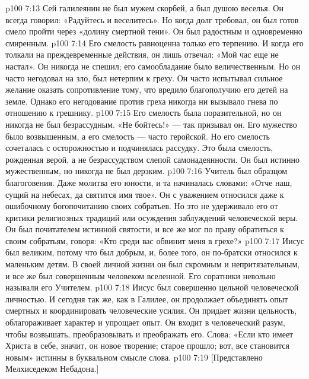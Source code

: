 \vs p100 7:13 Сей галилеянин не был мужем скорбей, а был душою веселья. Он всегда говорил: «Радуйтесь и веселитесь». Но когда долг требовал, он был готов смело пройти через «долину смертной тени». Он был радостным и одновременно смиренным.
\vs p100 7:14 Его смелость равноценна только его терпению. И когда его толкали на преждевременные действия, он лишь отвечал: «Мой час еще не настал». Он никогда не спешил; его самообладание было величественным. Но он часто негодовал на зло, был нетерпим к греху. Он часто испытывал сильное желание оказать сопротивление тому, что вредило благополучию его детей на земле. Однако его негодование против греха никогда ни вызывало гнева по отношению к грешнику.
\vs p100 7:15 Его смелость была поразительной, но он никогда не был безрассудным. «Не бойтесь!» --- так призывал он. Его мужество было возвышенным, а его смелость --- часто геройской. Но его смелость сочеталась с осторожностью и подчинялась рассудку. Это была смелость, рожденная верой, а не безрассудством слепой самонадеянности. Он был истинно мужественным, но никогда не был дерзким.
\vs p100 7:16 Учитель был образцом благоговения. Даже молитва его юности, и та начиналась словами: «Отче наш, сущий на небесах, да святится имя твое». Он с уважением относился даже к ошибочному богопочитанию своих собратьев. Но это не удерживало его от критики религиозных традиций или осуждения заблуждений человеческой веры. Он был почитателем истинной святости, и все же мог по праву обратиться к своим собратьям, говоря: «Кто среди вас обвинит меня в грехе?»
\vs p100 7:17 Иисус был великим, потому что был добрым, и, более того, он по\hyp{}братски относился к маленьким детям. В своей личной жизни он был скромным и непритязательным, и все же был совершенным человеком вселенной. Его соратники невольно называли его Учителем.
\vs p100 7:18 Иисус был совершенно цельной человеческой личностью. И сегодня так же, как в Галилее, он продолжает объединять опыт смертных и координировать человеческие усилия. Он придает жизни цельность, облагораживает характер и упрощает опыт. Он входит в человеческий разум, чтобы возвышать, преобразовывать и преображать его. Слова: «Если кто имеет Христа в себе, значит, он новое творение; старое прошло; вот, все становится новым» истинны в буквальном смысле слова.
\vsetoff
\vs p100 7:19 [Представлено Мелхиседеком Небадона.]
